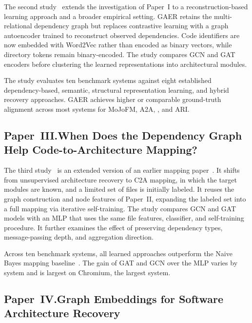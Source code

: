 The second study~\cite{gaer} extends the investigation of Paper~I to a reconstruction-based learning approach and a broader empirical setting. GAER retains the multi-relational dependency graph but replaces contrastive learning with a graph autoencoder trained to reconstruct observed dependencies. Code identifiers are now embedded with Word2Vec rather than encoded as binary vectors, while directory tokens remain binary-encoded. The study compares GCN and GAT encoders before clustering the learned representations into architectural modules.
 
The study evaluates ten benchmark systems against eight established dependency-based, semantic, structural representation learning, and hybrid recovery approaches. GAER achieves higher or comparable ground-truth alignment across most systems for MoJoFM, A2A, \cc{}, and ARI.

\subsection[Paper~III: C2A Mapping]{Paper~III.\quad When Does the Dependency Graph Help Code-to-Architecture Mapping?}
\label{sec:overview-c2a}

The third study~\cite{c2a_mapping} is an extended version of an earlier mapping paper~\cite{jabeen2025graph}. It shifts from unsupervised architecture recovery to C2A mapping, in which the target modules are known, and a limited set of files is initially labeled. It reuses the graph construction and node features of Paper~II, expanding the labeled set into a full mapping via iterative self-training. The study compares GCN and GAT models with an MLP that uses the same file features, classifier, and self-training procedure. It further examines the effect of preserving dependency types, message-passing depth, and aggregation direction.
 
Across ten benchmark systems, all learned approaches outperform the Naive Bayes mapping baseline~\cite{olsson2022automatically}. The gain of GAT and GCN over the MLP varies by system and is largest on Chromium, the largest system.

\subsection[Paper~IV: Architecture Recovery]{Paper~IV.\quad Graph Embeddings for Software Architecture Recovery}
\label{sec:overview-structsar}

